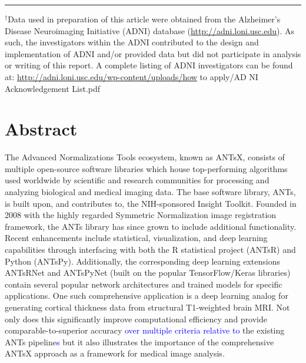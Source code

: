 \documentclass[12pt,]{article}
\begin{document}
\noindent

\rule{4cm}{0.4pt}

\tiny

\(^{\dagger}\)Data used in preparation of this article were obtained
from the Alzheimer's Disease Neuroimaging Initiative (ADNI) database
(\url{http://adni.loni.usc.edu}). As such, the investigators within the
ADNI contributed to the design and implementation of ADNI and/or
provided data but did not participate in analysis or writing of this
report. A complete listing of ADNI investigators can be found at:
\url{http://adni.loni.usc.edu/wp-content/uploads/how} to apply/AD NI
Acknowledgement List.pdf

\normalsize

\newpage


\hypertarget{abstract}{%
\section*{Abstract}\label{abstract}}

The Advanced Normalizations Tools ecosystem, known as ANTsX, consists of
multiple open-source software libraries which house top-performing
algorithms used worldwide by scientific and research communities for
processing and analyzing biological and medical imaging data. The base
software library, ANTs, is built upon, and contributes to, the
NIH-sponsored Insight Toolkit. Founded in 2008 with the highly regarded
Symmetric Normalization image registration framework, the ANTs library
has since grown to include additional functionality. Recent enhancements
include statistical, visualization, and deep learning capabilities
through interfacing with both the R statistical project (ANTsR) and
Python (ANTsPy). Additionally, the corresponding deep learning
extensions ANTsRNet and ANTsPyNet (built on the popular TensorFlow/Keras
libraries) contain several popular network architectures and trained
models for specific applications. One such comprehensive application is
a deep learning analog for generating cortical thickness data from
structural T1-weighted brain MRI. Not only does this significantly
improve computational efficiency and provide comparable-to-superior
accuracy \textcolor{blue}{over multiple criteria relative
to} the existing ANTs pipeline\textcolor{blue}{s} but it also
illustrates the importance of the comprehensive ANTsX approach as a
framework for medical image analysis.
\end{document}
